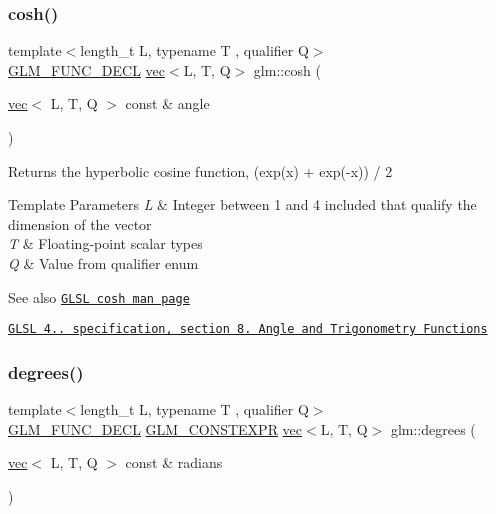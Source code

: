 \subsubsection{\texorpdfstring{cosh()}{cosh()}}
{\footnotesize\ttfamily template$<$length\+\_\+t L, typename T , qualifier Q$>$ \\
\mbox{\hyperlink{setup_8hpp_ab2d052de21a70539923e9bcbf6e83a51}{G\+L\+M\+\_\+\+F\+U\+N\+C\+\_\+\+D\+E\+CL}} \mbox{\hyperlink{structglm_1_1vec}{vec}}$<$L, T, Q$>$ glm\+::cosh (\begin{DoxyParamCaption}\item[{\mbox{\hyperlink{structglm_1_1vec}{vec}}$<$ L, T, Q $>$ const \&}]{angle }\end{DoxyParamCaption})}

Returns the hyperbolic cosine function, (exp(x) + exp(-\/x)) / 2


\begin{DoxyTemplParams}{Template Parameters}
{\em L} & Integer between 1 and 4 included that qualify the dimension of the vector \\
\hline
{\em T} & Floating-\/point scalar types \\
\hline
{\em Q} & Value from qualifier enum\\
\hline
\end{DoxyTemplParams}
\begin{DoxySeeAlso}{See also}
\href{http://www.opengl.org/sdk/docs/manglsl/xhtml/cosh.xml}{\tt G\+L\+SL cosh man page} 

\href{http://www.opengl.org/registry/doc/GLSLangSpec.4.20.8.pdf}{\tt G\+L\+SL 4.. specification, section 8. Angle and Trigonometry Functions} 
\end{DoxySeeAlso}
\mbox{\label{group__core__func__trigonometric_ga8faec9e303538065911ba8b3caf7326b}} 
\subsubsection{\texorpdfstring{degrees()}{degrees()}}
{\footnotesize\ttfamily template$<$length\+\_\+t L, typename T , qualifier Q$>$ \\
\mbox{\hyperlink{setup_8hpp_ab2d052de21a70539923e9bcbf6e83a51}{G\+L\+M\+\_\+\+F\+U\+N\+C\+\_\+\+D\+E\+CL}} \mbox{\hyperlink{setup_8hpp_a08b807947b47031d3a511f03f89645ad}{G\+L\+M\+\_\+\+C\+O\+N\+S\+T\+E\+X\+PR}} \mbox{\hyperlink{structglm_1_1vec}{vec}}$<$L, T, Q$>$ glm\+::degrees (\begin{DoxyParamCaption}\item[{\mbox{\hyperlink{structglm_1_1vec}{vec}}$<$ L, T, Q $>$ const \&}]{radians }\end{DoxyParamCaption})}

